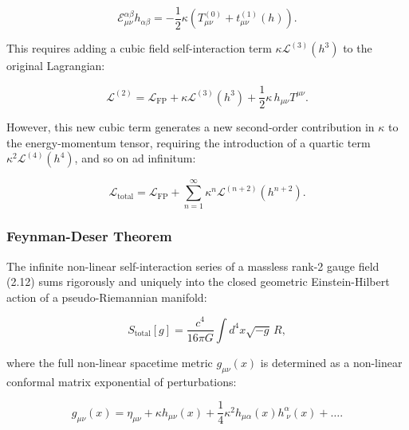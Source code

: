 \begin{equation}\label{eq:2.10}\tag{2.10}
\mathcal{E}_{\mu\nu}^{\alpha\beta} h_{\alpha\beta} = -\frac{1}{2}\kappa \left( T_{\mu\nu}^{(0)} + t_{\mu\nu}^{(1)}(h) \right).
\end{equation}

This requires adding a cubic field self-interaction term $\kappa \mathcal{L}^{(3)}(h^3)$ to the original Lagrangian:

\begin{equation}\label{eq:2.11}\tag{2.11}
\mathcal{L}^{(2)} = \mathcal{L}_{\text{FP}} + \kappa \mathcal{L}^{(3)}(h^3) + \frac{1}{2}\kappa \, h_{\mu\nu} T^{\mu\nu}.
\end{equation}

However, this new cubic term generates a new second-order contribution in $\kappa$ to the energy-momentum tensor, requiring the introduction of a quartic term $\kappa^2 \mathcal{L}^{(4)}(h^4)$, and so on ad infinitum:

\begin{equation}\label{eq:2.12}\tag{2.12}
\mathcal{L}_{\text{total}} = \mathcal{L}_{\text{FP}} + \sum_{n=1}^\infty \kappa^n \mathcal{L}^{(n+2)}(h^{n+2}).
\end{equation}

\subsubsection{Feynman-Deser Theorem}\label{sec:feynman-deser-thm}

\begin{theorem}\label{thm:feynman-deser}
The infinite non-linear self-interaction series of a massless rank-2 gauge field (2.12) sums rigorously and uniquely into the closed geometric Einstein-Hilbert action of a pseudo-Riemannian manifold:

\begin{equation}\label{eq:2.13}\tag{2.13}
S_{\text{total}}[g] = \frac{c^4}{16\pi G} \int d^4x \sqrt{-g} \, R,
\end{equation}

where the full non-linear spacetime metric $g_{\mu\nu}(x)$ is determined as a non-linear conformal matrix exponential of perturbations:

\begin{equation}\label{eq:2.14}\tag{2.14}
g_{\mu\nu}(x) = \eta_{\mu\nu} + \kappa h_{\mu\nu}(x) + \frac{1}{4}\kappa^2 h_{\mu\alpha}(x) h^\alpha_{\;\nu}(x) + \dots.
\end{equation}
\end{theorem}

